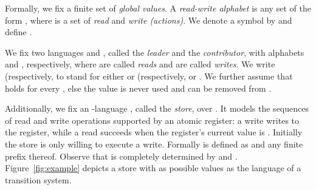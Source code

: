 \documentclass{llncs}
\begin{document}
Formally, we fix a finite set  of \emph{global values}.
A {\em read-write alphabet} is any set of the form , where
 is a set of {\em read} and {\em write (actions)}. We denote a symbol
 by  and define .

We fix two languages  and
, called the \emph{leader} and the
\emph{contributor}, with alphabets  and
, respectively, where   are called
\emph{reads} and  are called \emph{writes}.   We write 
(respectively,  to stand for either  or  (respectively,
 or . We further assume that
 holds for every 
, else the value  is never used and can be removed from . 

Additionally, we fix an -language , called the {\em store}, 
over . It models
the sequences of read and write operations supported 
by an atomic register: a write  writes  to the register,
while a read  succeeds when the register's current value is . 
Initially the store is only willing to execute a write. 
Formally  is defined as 
 and any finite prefix thereof.
Observe that  is completely determined by  and .
Figure~\ref{fig:example} depicts a store with  as possible values as the language
of a transition system.
\end{document}
